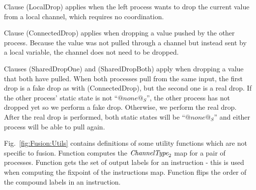 Clause (LocalDrop) applies when the left process wants to drop the current value from a local channel, which requires no coordination. 

Clause (ConnectedDrop) applies when dropping a value pushed by the other process.
Because the value was not pulled through a channel but instead sent by a local variable, the channel does not need to be dropped.


Clauses (SharedDropOne) and (SharedDropBoth) apply when dropping a value that both have pulled.
When both processes pull from the same input, the first drop is a fake drop as with (ConnectedDrop), but the second one is a real drop.
If the other process' static state is not ``$@none@_S$'', the other process has not dropped yet so we perform a fake drop.
Otherwise, we perform the real drop.
After the real drop is performed, both static states will be ``$@none@_S$'' and either process will be able to pull again.




\smallskip
Fig.~\ref{fig:Fusion:Utils} contains definitions of some utility functions which are not specific to fusion.
Function  computes the $\textit{ChannelType}_2$ map for a pair of processes.
Function  gets the set of output labels for an instruction - this is used when computing the fixpoint of the instructions map.
Function  flips the order of the compound labels in an instruction.
